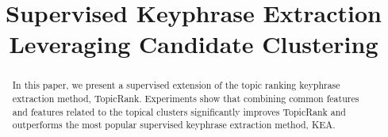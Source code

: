 \documentclass[11pt,letterpaper]{article}
\title{Supervised Keyphrase Extraction Leveraging Candidate Clustering}
\date{}
\begin{document}
  \maketitle

  \begin{abstract}
    In this paper, we present a supervised extension of the topic ranking
    keyphrase extraction method, TopicRank. Experiments show that combining
    common features and features related to the topical clusters significantly
    improves TopicRank and outperforms the most popular supervised keyphrase
    extraction method, KEA.
  \end{abstract}

  
  
  
  
  


  
  
\end{document}

